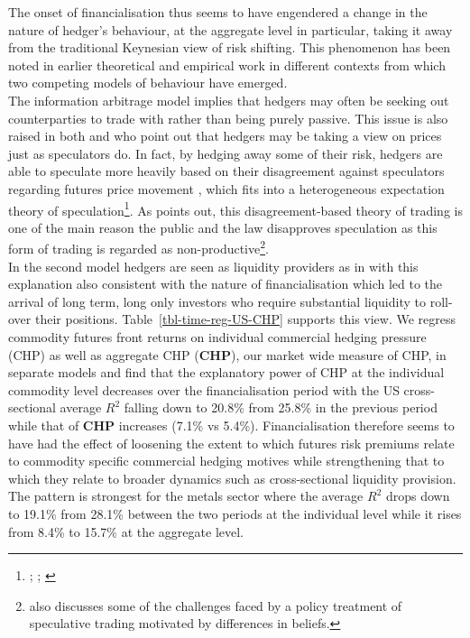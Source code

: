 \documentclass[
  authoryear,
  preprint,
  3p]{elsarticle}
\begin{document}
The onset of financialisation thus seems to have engendered a change in
the nature of hedger's behaviour, at the aggregate level in particular,
taking it away from the traditional Keynesian view of risk shifting.
This phenomenon has been noted in earlier theoretical and empirical work
\citep{danthine_information_1978, stout_why_1998} in different contexts
from which two competing models of behaviour have emerged.\\
The information arbitrage model
\citep{grossman_impossibility_1980, danthine_information_1978, kyle_informed_1989}
implies that hedgers may often be seeking out counterparties to trade
with rather than being purely passive. This issue is also raised in both
\citet{cheng_financialisation_2014} and \citet{stulz_rethink_1996} who
point out that hedgers may be taking a view on prices just as
speculators do. In fact, by hedging away some of their risk, hedgers are
able to speculate more heavily based on their disagreement against
speculators regarding futures price movement
\citep{simsek_speculation_2013}, which fits into a heterogeneous
expectation theory of speculation\footnote{\citet{hirshleifer_speculation_1975};
  \citet{hirshleifer_reply_1976}; \citet{hirshleifer_theory_1977}}. As
\citet{stout_why_1998} points out, this disagreement-based theory of
trading is one of the main reason the public and the law disapproves
speculation as this form of trading is regarded as
non-productive\footnote{\citet{duffie_challenges_2014} also discusses
  some of the challenges faced by a policy treatment of speculative
  trading motivated by differences in beliefs.}.\\
In the second model hedgers are seen as liquidity providers as in
\citet{kang_tale_2020} with this explanation also consistent with the
nature of financialisation which led to the arrival of long term, long
only investors who require substantial liquidity to roll-over their
positions. Table~\ref{tbl-time-reg-US-CHP} supports this view. We
regress commodity futures front returns on individual commercial hedging
pressure (CHP) as well as aggregate CHP (\textbf{CHP}), our market wide
measure of CHP, in separate models and find that the explanatory power
of CHP at the individual commodity level decreases over the
financialisation period with the US cross-sectional average \(R^{2}\)
falling down to 20.8\% from 25.8\% in the previous period while that of
\textbf{CHP} increases (7.1\% vs 5.4\%). Financialisation therefore
seems to have had the effect of loosening the extent to which futures
risk premiums relate to commodity specific commercial hedging motives
while strengthening that to which they relate to broader dynamics such
as cross-sectional liquidity provision. The pattern is strongest for the
metals sector where the average \(R^{2}\) drops down to 19.1\% from
28.1\% between the two periods at the individual level while it rises
from 8.4\% to 15.7\% at the aggregate level.
\end{document}
